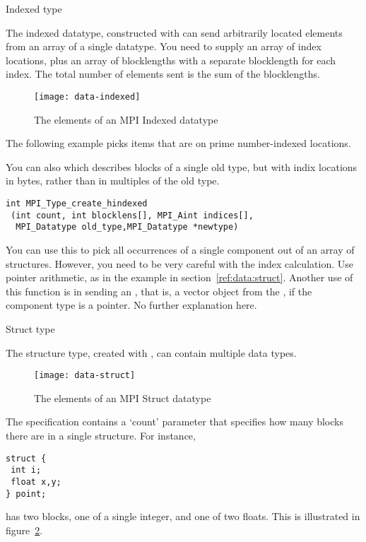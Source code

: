  {Indexed type}
\label{sec:data:indexed}

The indexed datatype, constructed with 
can send arbitrarily located elements from an array of a single datatype.
You need to supply an array of index locations, plus an array of blocklengths
with a separate blocklength for each index. The total number of elements sent
is the sum of the blocklengths.
%
%

\begin{figure}[ht]
  \texttt{[image: data-indexed]}
  \caption{The elements of an MPI Indexed datatype}
  \label{fig:data-indexed}
\end{figure}

The following example picks items that are on prime number-indexed
locations.

You can also  which describes blocks
of a single old type, but with indix locations in bytes, rather than
in multiples of the old type.
\begin{verbatim}
int MPI_Type_create_hindexed
 (int count, int blocklens[], MPI_Aint indices[],
  MPI_Datatype old_type,MPI_Datatype *newtype)
\end{verbatim}
You can use this to pick all occurrences of a single component out of
an array of structures. However, you need to be very careful with the
index calculation. Use pointer arithmetic, as in the example in
section~\ref{ref:data:struct}.  Another use of this function is in
sending an , that
is, a vector object from the , if
the component type is a pointer. No further explanation here.

 {Struct type}
\label{sec:data:struct}

The structure type, created with ,
can contain multiple data types.
%
\begin{figure}[ht]
  \texttt{[image: data-struct]}
  \caption{The elements of an MPI Struct datatype}
  \label{fig:data-struct}
\end{figure}
%
The specification contains a `count' parameter that specifies how many blocks
there are in a single structure. For instance,
\begin{verbatim}
struct {
 int i;
 float x,y;
} point;
\end{verbatim}
has two blocks, one of a single integer, and one of two floats.
This is illustrated in figure~\ref{fig:data-struct}.

